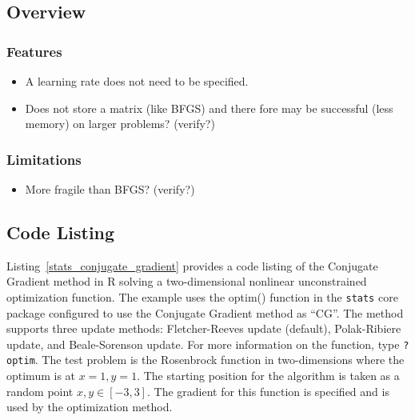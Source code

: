 \subsection{Overview}

\subsubsection{Features}

\begin{itemize}
	\item A learning rate does not need to be specified.
	\item Does not store a matrix (like BFGS) and there fore may be successful (less memory) on larger problems? (verify?)
\end{itemize}

\subsubsection{Limitations}

\begin{itemize}
	\item More fragile than BFGS? (verify?)
\end{itemize}

\subsection{Code Listing}
Listing~\ref{stats_conjugate_gradient} provides a code listing of the Conjugate Gradient method in R solving a two-dimensional nonlinear unconstrained optimization function.
The example uses the {optim()} function in the \texttt{stats} core package configured to use the Conjugate Gradient method as ``CG''. The method supports three update methods: Fletcher-Reeves update (default), Polak-Ribiere update, and Beale-Sorenson update. For more information on the function, type \texttt{?optim}.
The test problem is the Rosenbrock function in two-dimensions where the optimum is at $x=1, y=1$. The starting position for the algorithm is taken as a random point $x,y \in [-3,3]$.  The gradient for this function is specified and is used by the optimization method.




